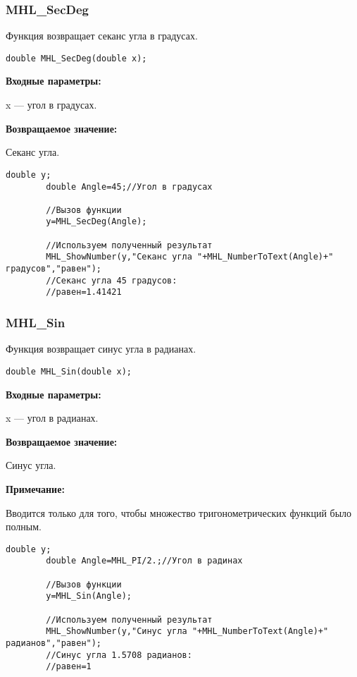 \documentclass[a4paper,12pt]{article}
\begin{document}
\subsubsection{MHL\_SecDeg}\label{MHL_SecDeg}

Функция возвращает секанс угла в градусах.


\begin{lstlisting}[label=code_syntax_MHL_SecDeg,caption=Синтаксис]
double MHL_SecDeg(double x);
\end{lstlisting}

\textbf{Входные параметры:}

 x --- угол в градусах.

\textbf{Возвращаемое значение:}

Секанс угла.


\begin{lstlisting}[label=code_use_MHL_SecDeg,caption=Пример использования]
        double y;
        double Angle=45;//Угол в градусах

        //Вызов функции
        y=MHL_SecDeg(Angle);

        //Используем полученный результат
        MHL_ShowNumber(y,"Секанс угла "+MHL_NumberToText(Angle)+" градусов","равен");
        //Секанс угла 45 градусов:
        //равен=1.41421
\end{lstlisting}

\subsubsection{MHL\_Sin}\label{MHL_Sin}

Функция возвращает синус угла в радианах.


\begin{lstlisting}[label=code_syntax_MHL_Sin,caption=Синтаксис]
double MHL_Sin(double x);
\end{lstlisting}

\textbf{Входные параметры:}

 x --- угол в радианах.

\textbf{Возвращаемое значение:}

Синус угла.

\textbf{Примечание:}

 Вводится только для того, чтобы множество тригонометрических функций было полным.


\begin{lstlisting}[label=code_use_MHL_Sin,caption=Пример использования]
        double y;
        double Angle=MHL_PI/2.;//Угол в радинах

        //Вызов функции
        y=MHL_Sin(Angle);

        //Используем полученный результат
        MHL_ShowNumber(y,"Синус угла "+MHL_NumberToText(Angle)+" радианов","равен");
        //Синус угла 1.5708 радианов:
        //равен=1
\end{lstlisting}
\end{document}
